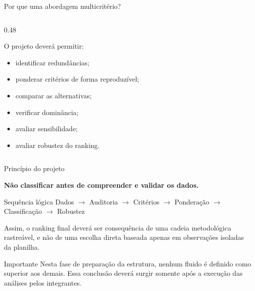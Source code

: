 \begin{frame}{Por que uma abordagem multicritério?}
\begin{columns}[T]
\begin{column}{0.48\textwidth}
            \vspace{0.2cm}

            O projeto deverá permitir:

            \begin{itemize}
                \item identificar redundâncias;
                \item ponderar critérios de forma reproduzível;
                \item comparar as alternativas;
                \item verificar dominância;
                \item avaliar sensibilidade;
                \item avaliar robustez do ranking.
            \end{itemize}

        \end{column}

    \end{columns}

\end{frame}



\begin{frame}{Princípio do projeto}

    \begin{center}

        \textbf{Não classificar antes de compreender e validar os dados.}

    \end{center}

    \vspace{0.4cm}

    \begin{block}{Sequência lógica}
        \centering
        Dados
        $\rightarrow$
        Auditoria
        $\rightarrow$
        Critérios
        $\rightarrow$
        Ponderação
        $\rightarrow$
        Classificação
        $\rightarrow$
        Robustez
    \end{block}

    \vspace{0.4cm}

    Assim, o ranking final deverá ser consequência de uma cadeia
    metodológica rastreável, e não de uma escolha direta baseada
    apenas em observações isoladas da planilha.

    \vspace{0.3cm}

    \begin{alertblock}{Importante}
        Nesta fase de preparação da estrutura, nenhum fluido é definido
        como superior aos demais. Essa conclusão deverá surgir somente
        após a execução das análises pelos integrantes.
    \end{alertblock}

\end{frame}



